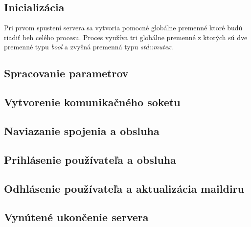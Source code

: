 \documentclass[11pt,a4paper]{article}
\begin{document}
	\subsection{Inicializácia}
		Pri prvom spustení servera sa vytvoria pomocné globálne premenné ktoré budú riadiť beh celého procesu. Proces využíva tri globálne premenné z ktorých sú dve premenné typu \textit{bool} a zvyšná premenná typu \textit{std::mutex}.

	\subsection{Spracovanie parametrov}
	\subsection{Vytvorenie komunikačného soketu}
	\subsection{Naviazanie spojenia a obsluha}
	\subsection{Prihlásenie používateľa a obsluha}
	\subsection{Odhlásenie používateľa a aktualizácia maildiru}
	\subsection{Vynútené ukončenie servera}
\end{document}
